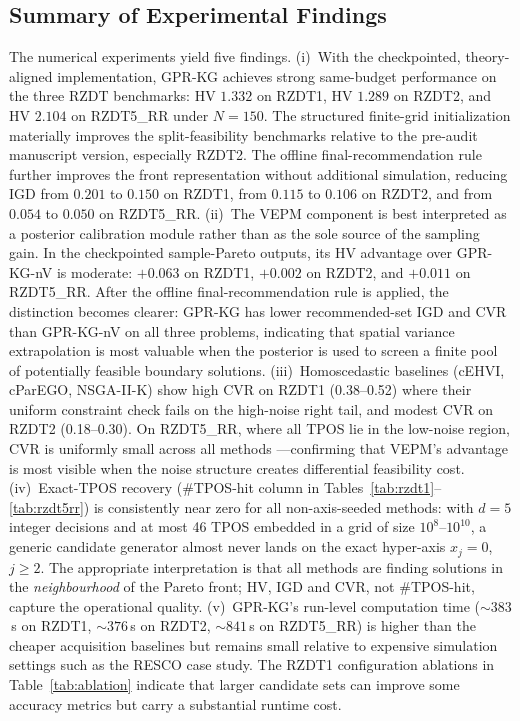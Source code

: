 \documentclass[12pt]{article}
\theoremstyle{plain}
\theoremstyle{definition}
\theoremstyle{remark}
\begin{document}
\subsection{Summary of Experimental Findings}\label{subsec:exp_summary}

The numerical experiments yield five findings.
(i)~With the checkpointed, theory-aligned implementation, GPR-KG
achieves strong same-budget performance on the three RZDT benchmarks:
HV $1.332$ on RZDT1, HV $1.289$ on RZDT2, and HV $2.104$ on
RZDT5\_RR under $N{=}150$.  The structured finite-grid initialization
materially improves the split-feasibility benchmarks relative to the
pre-audit manuscript version, especially RZDT2.  The offline
final-recommendation rule further improves the front representation
without additional simulation, reducing IGD from $0.201$ to $0.150$
on RZDT1, from $0.115$ to $0.106$ on RZDT2, and from $0.054$ to
$0.050$ on RZDT5\_RR.
(ii)~The VEPM component is best interpreted as a posterior calibration
module rather than as the sole source of the sampling gain.  In the
checkpointed sample-Pareto outputs, its HV advantage over GPR-KG-nV is
moderate: $+0.063$ on RZDT1, $+0.002$ on RZDT2, and $+0.011$ on
RZDT5\_RR.  After the offline final-recommendation rule is applied,
the distinction becomes clearer: GPR-KG has lower recommended-set IGD
and CVR than GPR-KG-nV on all three problems, indicating that spatial
variance extrapolation is most valuable when the posterior is used to
screen a finite pool of potentially feasible boundary solutions.
(iii)~Homoscedastic baselines (cEHVI, cParEGO, NSGA-II-K) show high
CVR on RZDT1 (0.38--0.52) where their uniform constraint check fails
on the high-noise right tail, and modest CVR on RZDT2 (0.18--0.30).
On RZDT5\_RR, where all TPOS lie in the low-noise region, CVR is
uniformly small across all methods ---confirming that VEPM's
advantage is most visible when the noise structure creates
differential feasibility cost.
(iv)~Exact-TPOS recovery ($\#$TPOS-hit column in
Tables~\ref{tab:rzdt1}--\ref{tab:rzdt5rr}) is consistently near zero
for all non-axis-seeded methods: with $d=5$ integer decisions and at
most 46 TPOS embedded in a grid of size $10^8$--$10^{10}$, a generic
candidate generator almost never lands on the exact hyper-axis
$x_j{=}0$, $j\ge 2$.  The appropriate
interpretation is that all methods are finding solutions in the
\emph{neighbourhood} of the Pareto front; HV, IGD and CVR, not
$\#$TPOS-hit, capture the operational quality.
(v)~GPR-KG's run-level computation time (${\sim}383$\,s on RZDT1,
${\sim}376$\,s on RZDT2, ${\sim}841$\,s on RZDT5\_RR) is higher than
the cheaper acquisition baselines but remains small relative to
expensive simulation settings such as the RESCO case study.  The RZDT1
configuration ablations in Table~\ref{tab:ablation} indicate that
larger candidate sets can improve some accuracy metrics but carry a
substantial runtime cost.
\end{document}
